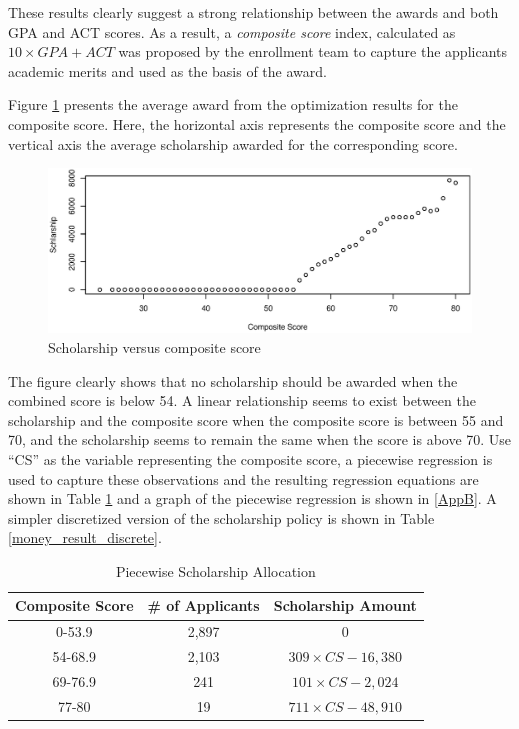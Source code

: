 \documentclass[12pt,english]{report}
\begin{document}
These results clearly suggest a strong relationship between the awards and both GPA and ACT scores.  As a result, a \textit{composite score} index, calculated as $10 \times GPA + ACT $ was proposed by the enrollment team to capture the applicants academic merits and used as the basis of the award.

Figure \ref{compositescore} presents the average award from the optimization results for the composite score. Here, the horizontal axis represents the composite score and the vertical axis the average scholarship awarded for the corresponding score. 
 \begin{figure}[ht]
   \centering
 \includegraphics[scale=0.65]{pic/scho_composite.eps}
 \caption{Scholarship versus composite score}
 \label{compositescore}
\end{figure}

The figure clearly shows that no scholarship should be awarded when the combined score is below 54.  A linear relationship seems to exist between the scholarship and the composite score when the composite score is between 55 and 70, and the scholarship seems to remain the same when the score is above 70. Use ``CS'' as the variable representing the composite score, a piecewise regression is used to capture these observations and the resulting regression equations are shown in Table \ref{money_result} and a graph of the piecewise regression is shown in \ref{AppB}. A simpler discretized version of the scholarship policy is shown in Table \ref{money_result_discrete}.

\begin{table}[ht]
\centering
\begin{tabular}{|c|c|c|}
\hline
Composite Score & \# of Applicants & Scholarship Amount \\ \hline
0-53.9         & 2,897	&0              \\ \hline
54-68.9        & 2,103  &$309\times CS -16,380 $            \\ \hline
69-76.9        &  241 &  $101\times CS - 2,024$           \\ \hline
77-80       & 19 &   $711 \times CS -48,910$          \\ \hline
\end{tabular}
\caption{Piecewise Scholarship Allocation}
\label{money_result}
\end{table}
\end{document}
